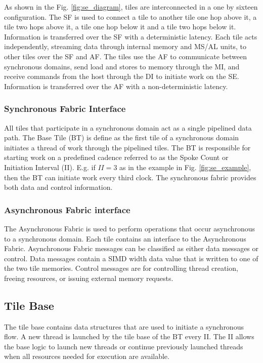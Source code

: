 As shown in the Fig. \ref{fig:se_diagram}, tiles are interconnected in a one by sixteen configuration.
The SF is used to connect a tile to another tile one hop above it, a tile two hops above it, a tile one hop below it and a tile two hops below it.
Information is transferred over the SF with a deterministic latency. 
Each tile acts independently, streaming data through internal memory and MS/AL units, to other tiles over the SF and AF.
The tiles use the AF to communicate between synchronous domains, send load and stores to memory through the MI, and receive commands from the host through the DI to initiate work on the SE.
Information is transferred over the AF with a non-deterministic latency.


\subsubsection{Synchronous Fabric Interface}
All tiles that participate in a synchronous domain act as a single pipelined data path.
The Base Tile (BT) is define as the first tile of a synchronous domain initiates a thread of work through the pipelined tiles.
The BT is responsible for starting work on a predefined cadence referred to as the Spoke Count or Initiation Interval (II).
E.g. if $II = 3$ as in the example in Fig. \ref{fig:se_example}, then the BT can initiate work every third clock.
The synchronous fabric provides both data and control information.

\subsubsection{Asynchronous Fabric interface}
The Asynchronous Fabric is used to perform operations that occur asynchronous to a synchronous domain.
Each tile contains an interface to the Asynchronous Fabric.
Asynchronous Fabric messages can be classified as either data messages or control.
Data messages contain a SIMD width data value that is written to one of the two tile memories.
Control messages are for controlling thread creation, freeing resources, or issuing external memory requests.

\subsection{Tile Base}
The tile base contains data structures that are used to initiate a synchronous flow.
A new thread is launched by the tile base of the BT every II.
The II allows the base logic to launch new threads or continue previously launched threads when all resources needed for execution are available.

